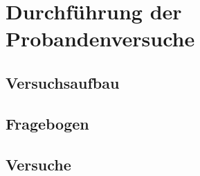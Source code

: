 
\chapter{Durchführung  der Probandenversuche}
\todo{}
\section{Versuchsaufbau}

\section{Fragebogen}

\section{Versuche}